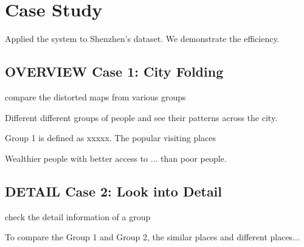 \section{Case Study}

Applied the system to Shenzhen's dataset. We demonstrate the efficiency. 

\subsection{OVERVIEW Case 1: City Folding}

compare the distorted maps from various groups

Different different groups of people and see their patterns across the city.

Group 1 is defined as xxxxx. The popular visiting places

Wealthier people with better access to ... than poor people. 

\subsection{DETAIL Case 2: Look into Detail}

check the detail information of a group

To compare the Group 1 and Group 2, the similar places and different places...